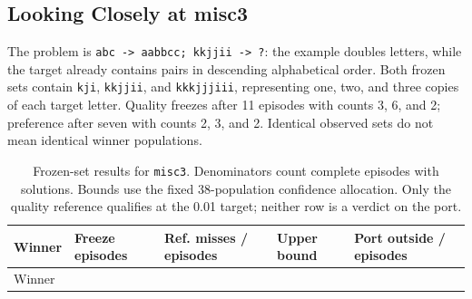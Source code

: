 \documentclass[10pt,letterpaper]{article}
\begin{document}
\subsection{Looking Closely at misc3}\label{sec:misc3-discrepancy}

The problem is \texttt{abc\ -\textgreater{}\ aabbcc;\ kkjjii\ -\textgreater{}\ ?}: the
example doubles letters, while the target already contains pairs in descending
alphabetical order. Both frozen sets contain \texttt{kji}, \texttt{kkjjii}, and
\texttt{kkkjjjiii}, representing one, two, and three copies of each target letter. Quality
freezes after 11 episodes with counts 3, 6, and 2; preference after seven with counts 2,
3, and 2. Identical observed sets do not mean identical winner populations.

\begin{longtable}[]{@{}
  >{\raggedright\arraybackslash}p{}
  >{\raggedleft\arraybackslash}p{}
  >{\raggedleft\arraybackslash}p{}
  >{\raggedleft\arraybackslash}p{}
  >{\raggedleft\arraybackslash}p{}@{}}
\caption{Frozen-set results for \protect\texttt{misc3}. Denominators count complete
episodes with solutions. Bounds use the fixed 38-population confidence allocation. Only
the quality reference qualifies at the 0.01 target; neither row is a verdict on the
port.}\label{tbl:misc3-summary}\tabularnewline
\toprule\noalign{}
\begin{minipage}[b]{\linewidth}\raggedright
Winner
\end{minipage} & \begin{minipage}[b]{\linewidth}\raggedleft
Freeze episodes
\end{minipage} & \begin{minipage}[b]{\linewidth}\raggedleft
Ref. misses / episodes
\end{minipage} & \begin{minipage}[b]{\linewidth}\raggedleft
Upper bound
\end{minipage} & \begin{minipage}[b]{\linewidth}\raggedleft
Port outside / episodes
\end{minipage} \\
\midrule\noalign{}
\endfirsthead
\toprule\noalign{}
\begin{minipage}[b]{\linewidth}\raggedright
Winner
\end{minipage} & \begin{minipage}[b]{\linewidth}\raggedleft

\end{minipage}
\end{longtable}
\end{document}
